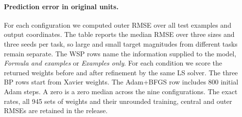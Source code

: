 \paragraph{Prediction error in original units.}
For each configuration we computed outer RMSE over all test examples and output coordinates. The table reports the median RMSE over three sizes and three seeds per task, so large and small target magnitudes from different tasks remain separate. The WSP rows name the information supplied to the model, \emph{Formula and examples} or \emph{Examples only}. For each condition we score the returned weights before and after refinement by the same LS solver. The three BP rows start from Xavier weights. The Adam+BFGS row includes 800 initial Adam steps. A zero is a zero median across the nine configurations. The exact rates, all 945 sets of weights and their unrounded training, central and outer RMSEs are retained in the release.
\begin{center}
\begin{minipage}{\linewidth}
\centering
\makeatletter{}\makeatother
\caption{Outer RMSE in target units, with one median over nine size--start combinations per task. WSP rows give the information supplied to the model. An arrow to LS means the returned weights were refined by trust-region least squares.}\label{tab:opt_rmse}
\scriptsize\setlength{\tabcolsep}{3.5pt}
\begin{tabular}{@{}lrrrrr@{}}\toprule

\end{tabular}
\end{minipage}
\end{center}


